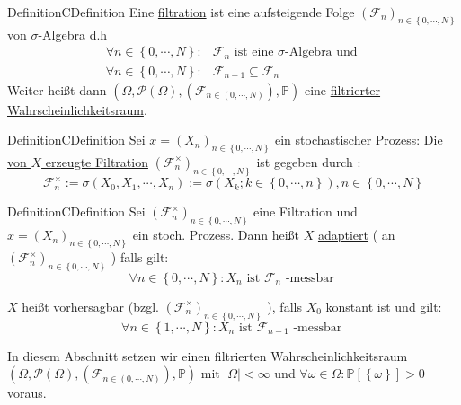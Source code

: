 \begin{ibox}[3.2]{Definition}{CDefinition}
	Eine \underline{filtration} ist eine aufsteigende Folge $ \left( \mathcal{F}_{n} \right)_{n \in \left\{ 0 , \cdots, N \right\}} $ von
	$\sigma$-Algebra d.h 
	\begin{align*}
		\forall n \in \left\{ 0 , \cdots, N \right\}:& \mathcal{F}_{n} \text{ ist eine $\sigma$-Algebra und }  \\
		\forall n \in \left\{ 0 , \cdots, N \right\}:& \mathcal{F}_{n-1} \subseteq \mathcal{F}_n 
	\end{align*}
Weiter heißt dann $ \left( \Omega, \mathcal{P} (\Omega), \left( \mathcal{F}_{n \in \left( 0 , \cdots, N \right)} \right), \mathbb{P}  \right) $ eine \underline{filtrierter Wahrscheinlichkeitsraum}.
\end{ibox}

\begin{ibox}[3.3]{Definition}{CDefinition}
    Sei $ x = \left( X_n \right)_{n \in \left\{ 0 , \cdots, N \right\}} $ ein stochastischer Prozess: Die \underline{von $ X $ erzeugte
		Filtration} $ \left( \mathcal{F}_{n}^{\times} \right)_{n \in \left\{ 0 , \cdots, N \right\}}$ ist gegeben durch :
		$$ \mathcal{F}_{n}^{\times} := \sigma \left( X_0, X_1 , \cdots, X_n \right) := \sigma \left( X_k ; k \in \left\{ 0 , \cdots, n \right\} \right), n \in \left\{ 0 , \cdots, N \right\} $$
\end{ibox}

\begin{ibox}[3.4]{Definition}{CDefinition}
	Sei $ \left( \mathcal{F}_{n}^{\times} \right)_{n \in \left\{ 0 , \cdots, N \right\}}$ eine Filtration und $ x = \left( X_n \right)_{n \in \left\{ 0 , \cdots, N \right\}} $ ein stoch. Prozess. Dann heißt $ X  $ \underline{adaptiert} ( an $ \left( \mathcal{F}_{n}^{\times} \right)_{n \in \left\{ 0 , \cdots, N \right\}}$  ) falls gilt: 
	$$ \forall n \in \left\{ 0 , \cdots, N \right\} : X_n \text{ ist } \mathcal{F}_{n} \text{ -messbar }   $$

	$ X $ heißt \underline{vorhersagbar} (bzgl. $ \left( \mathcal{F}_{n}^{\times} \right)_{n \in \left\{ 0 , \cdots, N \right\}}$ ), falls 
	$ X_0 $ konstant ist und gilt: 
	$$ \forall n \in \left\{ 1 , \cdots, N \right\} : X_n \text{ ist } \mathcal{F}_{n-1} \text{ -messbar }   $$
\end{ibox}

In diesem Abschnitt setzen wir einen filtrierten Wahrscheinlichkeitsraum $ \left( \Omega, \mathcal{P} (\Omega), \left( \mathcal{F}_{n \in \left( 0 , \cdots, N \right)} \right), \mathbb{P}  \right) $ mit $ \left| \Omega \right| < \infty $ und $ \forall \omega \in \Omega : 
\mathbb{P} \left[ \left\{ \omega \right\} \right] > 0 $ voraus.


